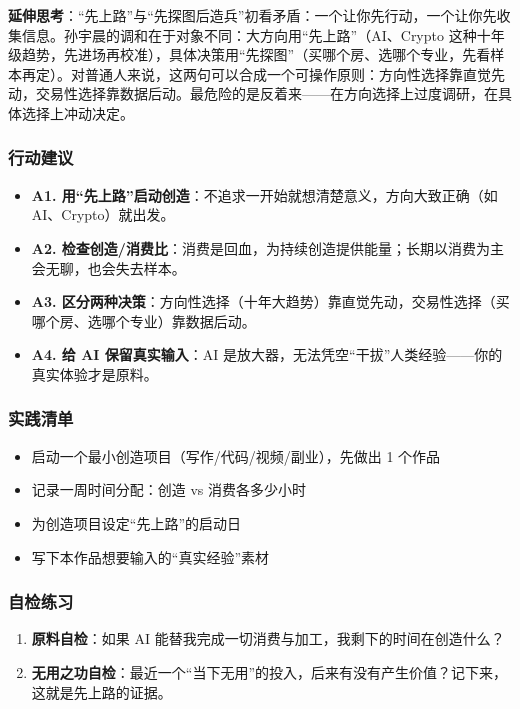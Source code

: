 \textbf{延伸思考}：``先上路''与``先探图后造兵''初看矛盾：一个让你先行动，一个让你先收集信息。孙宇晨的调和在于对象不同：大方向用``先上路''（AI、Crypto
这种十年级趋势，先进场再校准），具体决策用``先探图''（买哪个房、选哪个专业，先看样本再定）。对普通人来说，这两句可以合成一个可操作原则：方向性选择靠直觉先动，交易性选择靠数据后动。最危险的是反着来------在方向选择上过度调研，在具体选择上冲动决定。

\subsubsection{行动建议}

\begin{itemize}
\tightlist
\item
  \textbf{A1.
  用``先上路''启动创造}：不追求一开始就想清楚意义，方向大致正确（如
  AI、Crypto）就出发。
\item
  \textbf{A2.
  检查创造/消费比}：消费是回血，为持续创造提供能量；长期以消费为主会无聊，也会失去样本。
\item
  \textbf{A3.
  区分两种决策}：方向性选择（十年大趋势）靠直觉先动，交易性选择（买哪个房、选哪个专业）靠数据后动。
\item
  \textbf{A4. 给 AI 保留真实输入}：AI
  是放大器，无法凭空``干拔''人类经验------你的真实体验才是原料。
\end{itemize}

\subsubsection{实践清单}

\begin{itemize}
\tightlist
\item[$\square$]
  启动一个最小创造项目（写作/代码/视频/副业），先做出 1 个作品
\item[$\square$]
  记录一周时间分配：创造 vs 消费各多少小时
\item[$\square$]
  为创造项目设定``先上路''的启动日
\item[$\square$]
  写下本作品想要输入的``真实经验''素材
\end{itemize}

\subsubsection{自检练习}

\begin{enumerate}
\def\labelenumi{\arabic{enumi}.}
\tightlist
\item
  \textbf{原料自检}：如果 AI
  能替我完成一切消费与加工，我剩下的时间在创造什么？
\item
  \textbf{无用之功自检}：最近一个``当下无用''的投入，后来有没有产生价值？记下来，这就是先上路的证据。
\end{enumerate}

